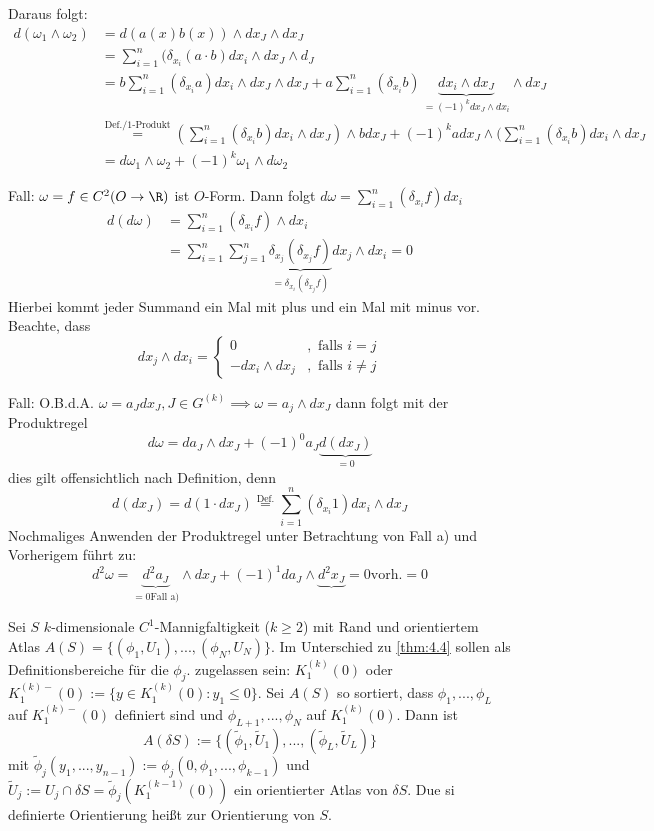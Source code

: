 \begin{enum-arab}
Daraus folgt:
\begin{align*}
d(\omega_1 \land \omega_2)&=d(a(x) b(x))\wedge dx_J \wedge dx_J\\
&= \sum_{i=1}^n(\delta_{x_i}(a\cdot b) dx_i \wedge dx_J \wedge d_J\\
&= b\sum_{i=1}^n(\delta_{x_i} a) dx_i \wedge dx_J \wedge dx_J + a \sum_{i=1}^n (\delta_{x_i} b)\, \underbrace{dx_i \wedge dx_J}_{=(-1)^k dx_J \wedge dx_i}  \wedge dx_J \\
&\stackrel{\text{Def./1-Produkt}}=(\sum_{i=1}^n(\delta_{x_i}b) dx_i \wedge dx_J)\wedge bdx_J + (-1)^k a dx_J \wedge(\sum_{i=1}^n(\delta_{x_i} b) dx_i \wedge dx_J \\
&= d\omega_1 \wedge \omega_2+(-1)^k \omega_1 \wedge d\omega_2
\end{align*}
\item 
\begin{enum-alph}
\item Fall: $\omega=f\in C^2(O\to \R)$ ist $O$-Form. Dann folgt $d\omega=\sum_{i=1}^n (\delta_{x_i} f)dx_i$
\begin{align*}
d(d\omega)&=\sum_{i=1}^n (\delta_{x_i} f)\wedge dx_i\\
&= \sum_{i=1}^n \sum_{j=1}^n \underbrace{\delta_{x_j}(\delta_{x_j}f)}_{=\delta_{x_i}(\delta_{x_j} f)} dx_j  \wedge dx_i = 0
\end{align*}
Hierbei kommt jeder Summand ein Mal mit plus und ein Mal mit minus vor. Beachte, dass
\[
dx_j\wedge dx_i=\begin{cases} 0 &, \text{ falls } i=j\\ -dx_i\wedge dx_j &,\text{ falls } i\neq j\end{cases}
\]
\item Fall: O.B.d.A. $\omega=a_J dx_J, J \in G^{(k)} \implies \omega=a_j\wedge dx_J$
dann folgt mit der Produktregel
\[
d\omega=da_J \wedge dx_J+(-1)^0 a_J \underbrace{d(dx_J)}_{=0}
\]
dies gilt offensichtlich nach Definition, denn
\[
d(dx_J)=d(1\cdot dx_J)\stackrel{\text{Def.}}=\sum_{i=1}^n(\delta_{x_i} 1) dx_i \wedge dx_J
\]
Nochmaliges Anwenden der Produktregel unter Betrachtung von Fall a) und Vorherigem führt zu:
\[
d^2\omega=\underbrace{d^2 a_J}_{=0 \text{Fall a)}} \wedge dx_J+(-1)^1 da_J \wedge \underbrace{d^2x_J}{=0 \text{vorh.}}=0
\]
\end{enum-alph}
\end{enum-arab}
\begin{theorem}[Definition] \label{thm:8.6}
Sei $S$ $k$-dimensionale $C^1$-Mannigfaltigkeit ($k\ge 2$) mit Rand und orientiertem Atlas $A(S)=\{(\phi_1, U_1), ..., (\phi_N, U_N)\}$. Im Unterschied zu \ref{thm:4.4} sollen als Definitionsbereiche für die $\phi_j$. zugelassen sein: $K_1^(k)(0)$ oder $ K_1^{(k)-}(0):=\{y\in K_1^{(k)}(0):y_1\le 0 \}$. Sei $A(S)$ so sortiert, dass $\phi_1,..., \phi_L$ auf $K_1^{(k)-}(0)$ definiert sind und $\phi_{L+1},..., \phi_N$ auf $K_1^{(k)}(0)$.
Dann ist 
\[
A(\delta S):=\{(\tilde \phi_1, \tilde U_1),...,(\tilde \phi_L, \tilde U_L)\} 
\]
mit $\tilde \phi_j(y_1,..., y_{n-1}):=\phi_j(0, \phi_1,..., \phi_{k-1})$ und $\tilde U_j:= U_j \cap \delta S=\tilde \phi_j(K_1^{(k-1)}(0))$ ein orientierter Atlas von $\delta S$. Due si definierte Orientierung heißt   zur Orientierung von $S$.
\end{theorem}
